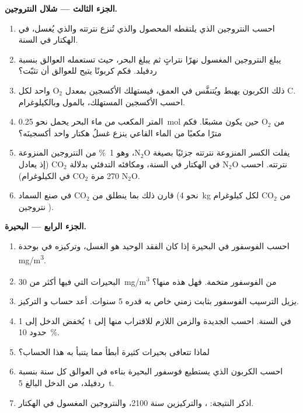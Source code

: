 \begin{problem}
\medskip
\noindent\textbf{الجزء الثالث --- شلال النتروجين.}
\begin{enumerate}[resume]
  \item احسب النتروجين الذي يلتقطه المحصول والذي تُنزع نترتته والذي
        يُغسل، في الهكتار في السنة.
  \item يبلغ النتروجين المغسول نهرًا نتراتٍ ثم يبلغ
        البحر، حيث تستعمله العوالق بنسبة ردفيلد. فكم
        كربونًا يتيح للعوالق أن تثبّت؟
  \item ذلك الكربون يهبط ويُتنفَّس في العمق، فيستهلك
        الأكسجين بمعدل $\mathrm{O_2}$ واحد لكل C. احسب الأكسجين المستهلك، بالمول
        وبالكيلوغرام.
  \item المتر المكعب من ماء البحر يحمل نحو \qty{0.25}{mol} من
        $\mathrm{O_2}$ حين يكون مشبعًا. فكم مترًا مكعبًا من الماء القاعي
        ينزع غسلُ هكتار واحد أكسجينَه؟
  \item يفلت الكسر المنزوعة نترتته جزئيًا بصيغة $\mathrm{N_2O}$، وهو
        \qty{1}{\%} من النتروجين المنزوعة نترتته. احسب $\mathrm{N_2O}$
        في الهكتار في السنة، ومكافئه التدفئي بدلالة $\mathrm{CO_2}$
        (إذ يعادل $\mathrm{N_2O}$ 270 مرة $\mathrm{CO_2}$ في الكيلوغرام).
  \item قارن ذلك بما ينطلق من $\mathrm{CO_2}$ في صنع السماد
        (نحو \qty{4}{kg} من $\mathrm{CO_2}$ لكل كيلوغرام نتروجين
        ).
\end{enumerate}

\medskip
\noindent\textbf{الجزء الرابع --- البحيرة.}
\begin{enumerate}[resume]
  \item احسب  الفوسفور في البحيرة إذا كان الفقد
        الوحيد هو الغسل، وتركيزه في  بوحدة
        \unit{mg/m^3}.
  \item البحيرات التي فيها أكثر من \qty{30}{mg/m^3} من الفوسفور
        متخمة. فهل هذه منها؟
  \item يزيل الترسيب الفوسفور بثابت زمني خاص به
        قدره 5 سنوات. أعد حساب  و
        التركيز.
  \item يُخفض الدخل إلى \qty{1}{t} في السنة. احسب 
        الجديدة والزمن اللازم للاقتراب منها إلى حدود \qty{10}{\%}.
  \item لماذا تتعافى بحيرات كثيرة أبطأ مما يتنبأ به هذا
        الحساب؟
  \item احسب الكربون الذي يستطيع فوسفور البحيرة بناءه في
        العوالق كل سنة بنسبة ردفيلد، من الدخل البالغ
        \qty{5}{t}.
  \item اذكر النتيجة: ، والتركيزين
        سنة 2100، والنتروجين المغسول في
        الهكتار.
\end{enumerate}
\end{problem}
